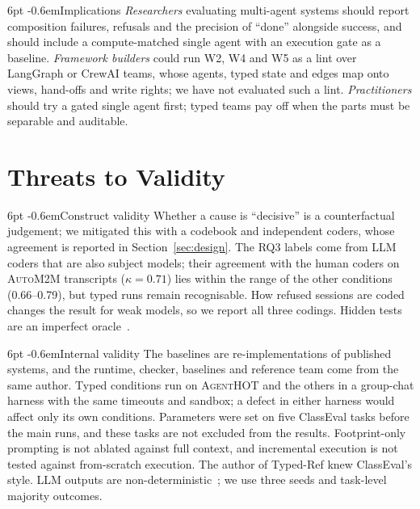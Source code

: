 \documentclass[pdflatex,sn-mathphys-num]{sn-jnl}
\makeatletter
\theoremstyle{thmstyleone}%
\theoremstyle{thmstyletwo}%
\theoremstyle{thmstylethree}%
\newcommand{\tool}{\textsc{AgentHOT}}
\newcommand{\auto}{\textsc{AutoM2M}}
\newcommand{\W}[1]{\textsf{W#1}}
\renewcommand\paragraph{\@startsection{paragraph}{4}{\z@}%
  {6pt \@plus 2pt \@minus 1pt}{-0.6em}{\normalfont\normalsize\bfseries}}
\makeatother
\begin{document}
\paragraph{Implications} \emph{Researchers} evaluating multi-agent systems
should report composition failures, refusals and the precision of ``done''
alongside success, and should include a compute-matched single agent with an
execution gate as a baseline. \emph{Framework builders} could run \W{2}, \W{4}
and \W{5} as a lint over LangGraph or CrewAI teams, whose agents, typed state
and edges map onto views, hand-offs and write rights; we have not evaluated
such a lint. \emph{Practitioners} should try a gated single agent first; typed
teams pay off when the parts must be separable and auditable.

\section{Threats to Validity}\label{sec:threats}

\paragraph{Construct validity} Whether a cause is ``decisive'' is a
counterfactual judgement; we mitigated this with a codebook and independent
coders, whose agreement is reported in Section~\ref{sec:design}. The RQ3 labels
come from LLM coders that are also subject models; their agreement with the
human coders on \auto{} transcripts ($\kappa=0.71$) lies within the range of
the other conditions (0.66--0.79), but typed runs remain recognisable. How refused sessions are coded
changes the result for weak models, so we report all three codings. Hidden tests
are an imperfect oracle~\cite{liu2023evalplus}.

\paragraph{Internal validity} The baselines are re-implementations of published
systems, and the runtime, checker, baselines and reference team come from the
same author. Typed conditions run on \tool{} and the others in a group-chat
harness with the same timeouts and sandbox; a defect in either harness would
affect only its own conditions. Parameters were set on five ClassEval tasks
before the main runs, and these tasks are not excluded from the results.
Footprint-only prompting is not ablated against full context, and incremental
execution is not tested against from-scratch execution. The author of Typed-Ref
knew ClassEval's style. LLM outputs are
non-deterministic~\cite{ouyang2025nondeterminism}; we use three seeds and
task-level majority outcomes.
\end{document}
